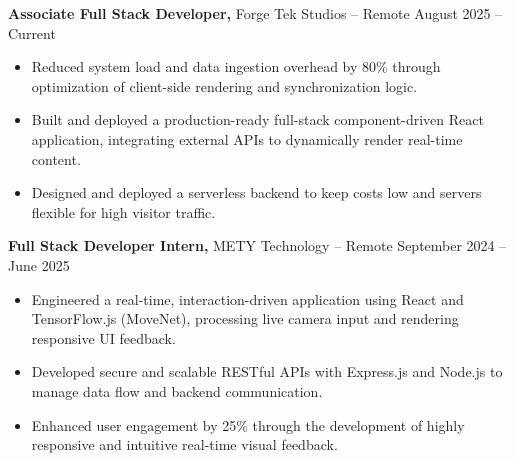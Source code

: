 \documentclass[11pt]{article}       %
\begin{document}
\textbf{Associate Full Stack Developer,} {Forge Tek Studios} -- Remote \hfill August 2025 -- Current 
\vspace{-9pt}
\begin{itemize}
  \item Reduced system load and data ingestion overhead by 80\% through optimization of client-side rendering and synchronization logic.
  \item Built and deployed a production-ready full-stack component-driven React application, integrating external APIs to dynamically render real-time content.
  \item Designed and deployed a serverless backend to keep costs low and servers flexible for high visitor traffic.
\end{itemize}

\textbf{Full Stack Developer Intern,} {METY Technology} -- Remote \hfill September 2024 -- June 2025 
\vspace{-9pt}
\begin{itemize}
  \item Engineered a real-time, interaction-driven application using React and TensorFlow.js (MoveNet), processing live camera input and rendering responsive UI feedback.
  \item Developed secure and scalable RESTful APIs with Express.js and Node.js to manage data flow and backend communication.
  \item Enhanced user engagement by 25\% through the development of highly responsive and intuitive real-time visual feedback.
\end{itemize}

\end{document}

